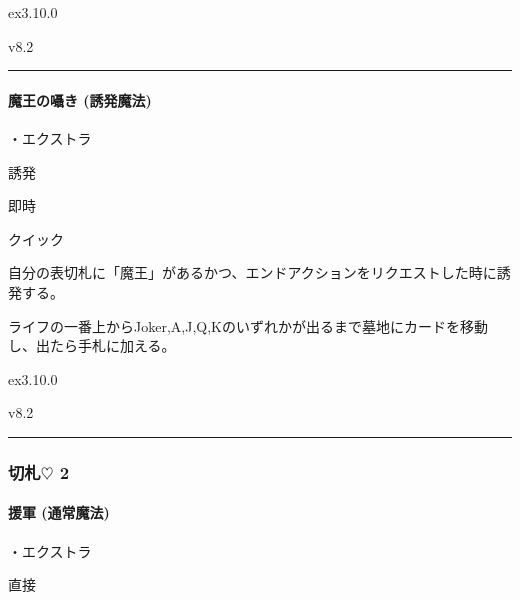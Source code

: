\documentclass[letterpaper,10pt,dvipdfmx]{sphinxmanual}
\begin{document}
\sphinxAtStartPar
{}  ex3.10.0

\sphinxAtStartPar
{}  v8.2


\bigskip\hrule\bigskip



\paragraph{魔王の囁き (誘発魔法)}
\label{\detokenize{auto/frameActionlist:act-darkwhisper}}\label{\detokenize{auto/frameActionlist:id32}}
\sphinxAtStartPar
{}

\sphinxAtStartPar
・エクストラ

\sphinxAtStartPar
{} 誘発

\sphinxAtStartPar
{} 即時

\sphinxAtStartPar
{} クイック

\sphinxAtStartPar
{}

\sphinxAtStartPar
自分の表切札に「魔王」があるかつ、エンドアクションをリクエストした時に誘発する。

\sphinxAtStartPar
{}

\sphinxAtStartPar
ライフの一番上からJoker,A,J,Q,Kのいずれかが出るまで墓地にカードを移動し、出たら手札に加える。

\sphinxAtStartPar
{}  ex3.10.0

\sphinxAtStartPar
{}  v8.2


\bigskip\hrule\bigskip



\subsubsection{切札{\normalsize $\heartsuit$} 2}
\label{\detokenize{auto/frameActionlist:id33}}

\paragraph{援軍 (通常魔法)}
\label{\detokenize{auto/frameActionlist:act-summonreinforcement}}\label{\detokenize{auto/frameActionlist:id34}}
\sphinxAtStartPar
{}

\sphinxAtStartPar
・エクストラ

\sphinxAtStartPar
{} 直接
\end{document}
